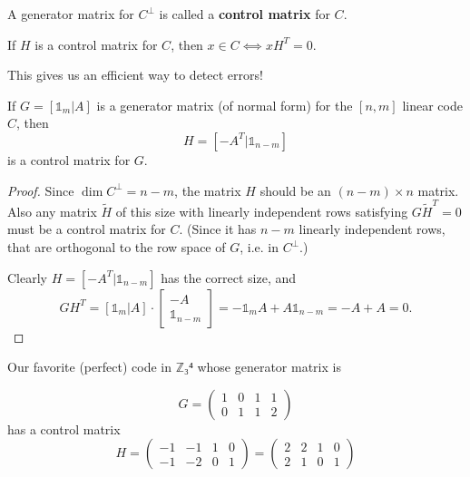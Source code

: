 \documentclass[english]{lbscript}
\begin{document}
\begin{definition}{}{}
  A generator matrix for \(C^{⟂}\) is called a \textbf{control matrix} for \(C\).
\end{definition}

\begin{remark}{}{}
  If \(H\) is a control matrix for \(C\), then \(x∈C⟺xH^{T}=0\).

  This gives us an efficient way to detect errors!
\end{remark}

\begin{theorem}{}{}
  If \(G=[𝟙_{m}|A]\) is a generator matrix (of normal form) for the \([n, m]\) linear code \(C\), then
  \begin{equation}
    \label{eq:142}
    H= \left[ -A^{T}| 𝟙_{n-m} \right]
  \end{equation}
  is a control matrix for \(G\).
\end{theorem}
\begin{proof}
  Since \(\dim C^{⟂}=n-m\), the matrix \(H\) should be an \((n-m)×n\) matrix. Also any matrix \(\tilde{H}\) of this size with linearly independent rows satisfying \(G\tilde{H}^{T}=0\) must be a control matrix for \(C\). (Since it has \(n-m\) linearly independent rows, that are orthogonal to the row space of \(G\), i.e. in \(C^{⟂}\).)

  Clearly \(H=[-A^{T}|𝟙_{n-m}]\) has the correct size, and
  \begin{equation}
    \label{eq:143}
    GH^{T}=[𝟙_{m}|A]⋅ \begin{bmatrix} -A \\ 𝟙_{n-m} \end{bmatrix} = -𝟙_{m}A+A𝟙_{n-m}=-A+A=0.
  \end{equation}
\end{proof}

\begin{example}{}{}
  Our favorite (perfect) code in \(ℤ₃⁴\) whose generator matrix is

  \begin{equation}
    \label{eq:144}
    G= \begin{pmatrix}
      1 & 0 & 1 & 1 \\
      0 & 1 & 1 & 2
    \end{pmatrix}
  \end{equation}
  has a control matrix
  \begin{equation}
    \label{eq:145}
    H = \begin{pmatrix} -1&-1&1&0\\-1&-2&0&1 \end{pmatrix}
    = \begin{pmatrix}
      2 & 2 & 1 & 0 \\
      2 & 1 & 0 & 1
    \end{pmatrix}
  \end{equation}
\end{example}
\end{document}

